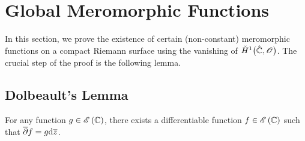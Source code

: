 \documentclass[../Moduli_Spaces_of_Riemann_Surfaces.tex]{subfiles}
\begin{document}
    \section{Global Meromorphic Functions}\label{CC:sec:global_meromorphic_functions}
    In this section, we prove the existence of certain (non-constant) meromorphic functions on a compact Riemann surface using the vanishing of $\check{H}^1\big(\hat{\mathbb{C}},\mathscr{O}\big)$. The crucial step of the proof is the following lemma.
    \subsection{Dolbeault's Lemma}
    \begin{lemma}[Dolbeault]
        For any function $g\in\mathscr{E}\left(\mathbb{C}\right)$, there exists a differentiable function $f\in\mathscr{E}\left(\mathbb{C}\right)$ such that $\overline{\partial}f=g\mathrm{d}\overline{z}$.
    \end{lemma}
\end{document}
